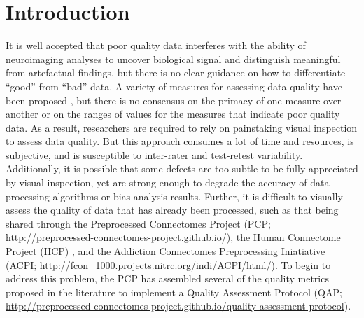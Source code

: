 \section{Introduction}
\label{intro}
It is well accepted that poor quality data interferes with the ability of neuroimaging analyses to uncover biological signal and distinguish meaningful from artefactual findings, but there is no clear guidance on how to differentiate “good” from “bad” data. A variety of measures for assessing data quality have been proposed \citep{magnotta2006,atkinson1997,friedman2008,mortamet2009,power2012,giannelli2010} , but there is no consensus on the primacy of one measure over another or on the ranges of values for the measures that indicate poor quality data. As a result, researchers are required to rely on painstaking visual inspection to assess data quality. But this approach consumes a lot of time and resources, is subjective, and is susceptible to inter-rater and test-retest variability. Additionally, it is possible that some defects are too subtle to be fully appreciated by visual inspection, yet are strong enough to degrade the accuracy of data processing algorithms or bias analysis results. Further, it is difficult to visually assess the quality of data that has already been processed, such as that being shared through the Preprocessed Connectomes Project (PCP; \url{http://preprocessed-connectomes-project.github.io/}), the Human Connectome Project (HCP) \citep{VanEssen2012, Glasser2013}, and the Addiction Connectomes Preprocessing Iniatiative (ACPI; \url{http://fcon_1000.projects.nitrc.org/indi/ACPI/html/}). To begin to address this problem, the PCP has assembled several of the quality metrics proposed in the literature to implement a Quality Assessment Protocol (QAP; \url{http://preprocessed-connectomes-project.github.io/quality-assessment-protocol}).

